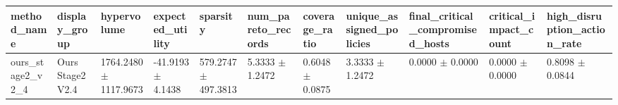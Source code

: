 \begin{tabular}{lllllllllll}
\hline
method_name & display_group & hypervolume & expected_utility & sparsity & num_pareto_records & coverage_ratio & unique_assigned_policies & final_critical_compromised_hosts & critical_impact_count & high_disruption_action_rate \\
\hline
ours_stage2_v2_4 & Ours Stage2 V2.4 & 1764.2480 $\pm$ 1117.9673 & -41.9193 $\pm$ 4.1438 & 579.2747 $\pm$ 497.3813 & 5.3333 $\pm$ 1.2472 & 0.6048 $\pm$ 0.0875 & 3.3333 $\pm$ 1.2472 & 0.0000 $\pm$ 0.0000 & 0.0000 $\pm$ 0.0000 & 0.8098 $\pm$ 0.0844 \\
\hline
\end{tabular}